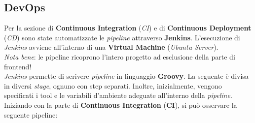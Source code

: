 \documentclass{article}
\begin{document}
\subsection*{DevOps}
Per la sezione di \textbf{Continuous Integration} (\textit{CI}) e di \textbf{Continuous Deployment} (\textit{CD}) sono state automatizzate le \textit{pipeline} attraverso \textbf{Jenkins}. L'esecuzione di \textit{Jenkins} avviene all'interno di una \textbf{Virtual Machine} (\textit{Ubuntu Server}).\vspace*{7pt}\\
\textit{Nota bene}: le pipeline ricoprono l’intero progetto ad esclusione della parte di frontend!\vspace*{7pt}\\
\textit{Jenkins} permette di scrivere \textit{pipeline} in linguaggio \textbf{Groovy}. La seguente è divisa in diversi \textit{stage}, ognuno con step separati. Inoltre, inizialmente, vengono specificati i tool e le variabili d'ambiente adeguate all'interno della \textit{pipeline}.\vspace*{7pt}\\
Iniziando con la parte di \textbf{Continuous Integration} (\textbf{CI}), si può osservare la seguente pipeline:
\end{document}
